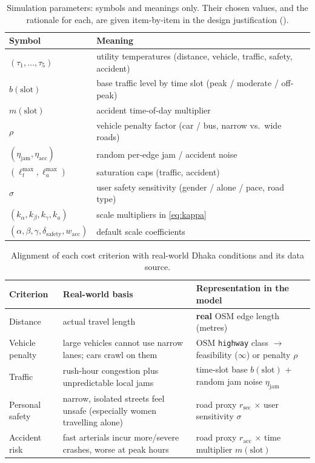 \documentclass{ai-lab-report}
\begin{document}
\begin{table}[H]
\centering
\small
\begin{tabularx}{\linewidth}{@{}lX@{}}
\toprule
Symbol & Meaning \\
\midrule
$(\tau_1,\dots,\tau_5)$ & utility temperatures (distance, vehicle, traffic, safety, accident) \\
$b(\mathrm{slot})$ & base traffic level by time slot (peak / moderate / off-peak) \\
$m(\mathrm{slot})$ & accident time-of-day multiplier \\
$\rho$ & vehicle penalty factor (car / bus, narrow vs.\ wide roads) \\
$(\eta_{\mathrm{jam}},\eta_{\mathrm{acc}})$ & random per-edge jam / accident noise \\
$(\ell^{\max}_{t},\ell^{\max}_{a})$ & saturation caps (traffic, accident) \\
$\sigma$ & user safety sensitivity (gender / alone / pace, road type) \\
$(k_\alpha,k_\beta,k_\gamma,k_a)$ & scale multipliers in \cref{eq:kappa} \\
$(\alpha,\beta,\gamma,\delta_{\mathrm{safety}},w_{\mathrm{acc}})$ & default scale coefficients \\
\bottomrule
\end{tabularx}
\caption{Simulation parameters: symbols and meanings only. Their chosen values, and the rationale for each, are given item-by-item in the design justification ().}
\label{tab:a1params}
\end{table}

\begin{table}[H]
\centering
\small
\begin{tabularx}{\linewidth}{@{}lXX@{}}
\toprule
Criterion & Real-world basis & Representation in the model \\
\midrule
Distance & actual travel length & \textbf{real} OSM edge length (metres) \\
Vehicle penalty & large vehicles cannot use narrow lanes; cars crawl on them & OSM \texttt{highway} class $\rightarrow$ feasibility ($\infty$) or penalty $\rho$ \\
Traffic & rush-hour congestion plus unpredictable local jams & time-slot base $b(\mathrm{slot})$ $+$ random jam noise $\eta_{\mathrm{jam}}$ \\
Personal safety & narrow, isolated streets feel unsafe (especially women travelling alone) & road proxy $r_{\mathrm{sec}}$ $\times$ user sensitivity $\sigma$ \\
Accident risk & fast arterials incur more/severe crashes, worse at peak hours & road proxy $r_{\mathrm{acc}}$ $\times$ time multiplier $m(\mathrm{slot})$ \\
\bottomrule
\end{tabularx}
\caption{Alignment of each cost criterion with real-world Dhaka conditions and its data source.}
\label{tab:a1align}
\end{table}
\end{document}

